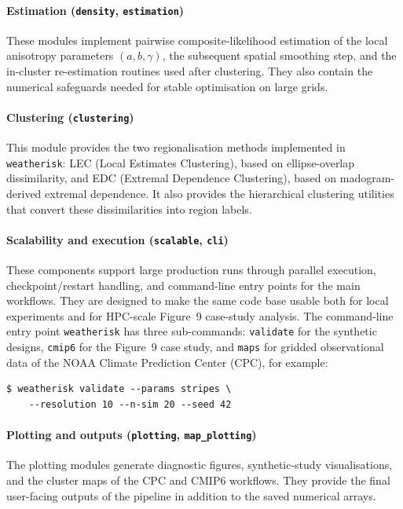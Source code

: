 \documentclass[preprint,12pt,a4paper]{elsarticle}
\newcommand{\revb}[1]{{#1}}
\begin{document}
\paragraph{Estimation (\texttt{density}, \texttt{estimation})}
These modules implement pairwise composite-likelihood estimation of
the local anisotropy parameters $(a,b,\gamma)$, the subsequent spatial
smoothing step, and the in-cluster re-estimation routines used after
clustering. They also contain the numerical safeguards needed for
stable optimisation on large grids.

\paragraph{Clustering (\texttt{clustering})}
This module provides the two regionalisation methods implemented in
\texttt{weatherisk}: LEC (Local Estimates Clustering), based on
ellipse-overlap dissimilarity, and EDC (Extremal Dependence
Clustering), based on madogram-derived extremal dependence. It also provides
the hierarchical clustering utilities that convert these
dissimilarities into region labels.

\paragraph{Scalability and execution (\texttt{scalable}, \texttt{cli})}
These components support large production runs through parallel
execution, checkpoint/restart handling, and command-line entry points
for the main workflows. They are designed to make the same code base
usable both for local experiments and for HPC-scale Figure~9
\revb{case-study analysis}.
The command-line entry point \texttt{weatherisk} has three
sub-commands: \texttt{validate} for the synthetic designs,
\texttt{cmip6} for the Figure~9 case study, and \texttt{maps} for
gridded observational data of the NOAA Climate Prediction Center
(CPC), for example:
\begin{lstlisting}[numbers=none]
$ weatherisk validate --params stripes \
    --resolution 10 --n-sim 20 --seed 42
\end{lstlisting}

\paragraph{Plotting and outputs (\texttt{plotting}, \texttt{map\_plotting})}
The plotting modules generate diagnostic figures, synthetic-study
visualisations, and the cluster maps of the CPC and CMIP6
workflows. They provide the final user-facing outputs of the
pipeline in addition to the saved numerical arrays.
\end{document}

